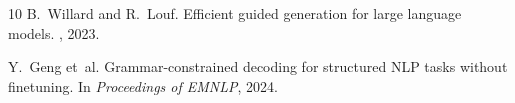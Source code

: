 \documentclass[11pt,a4paper]{article}
\begin{document}
\begin{thebibliography}{10}
B.~Willard and R.~Louf.
\newblock Efficient guided generation for large language models.
, 2023.

Y.~Geng et~al.
\newblock Grammar-constrained decoding for structured {NLP} tasks without finetuning.
\newblock In {\em Proceedings of EMNLP}, 2024.

\end{thebibliography}
\end{document}
